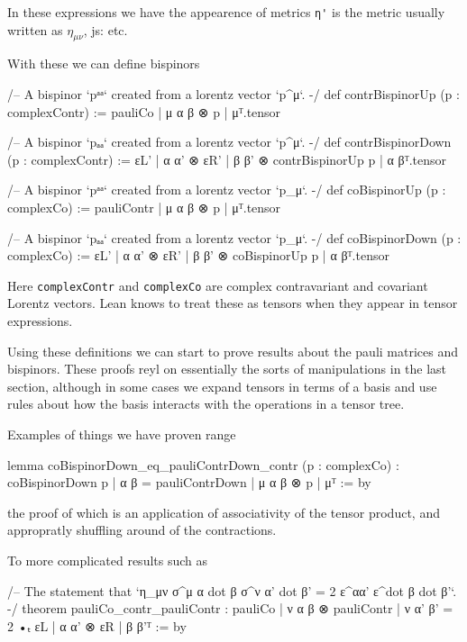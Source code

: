 \documentclass[a4paper, 11pt]{article}
\newcommand{\js}[1]{ {\color{magenta} js:  #1}}
\begin{document}
In these expressions we have the appearence of metrics \lstinline|η'| is the metric usually written as 
$\eta_{\mu \nu}$, \js{etc.}

With these we can define bispinors 
\begin{code}
/-- A bispinor `pᵃᵃ` created from a lorentz vector `p^μ`. -/
def contrBispinorUp (p : complexContr) :=
  {pauliCo | μ α β ⊗ p | μ}ᵀ.tensor

/-- A bispinor `pₐₐ` created from a lorentz vector `p^μ`. -/
def contrBispinorDown (p : complexContr) :=
  {εL' | α α' ⊗ εR' | β β' ⊗ contrBispinorUp p | α β}ᵀ.tensor

/-- A bispinor `pᵃᵃ` created from a lorentz vector `p_μ`. -/
def coBispinorUp (p : complexCo) := {pauliContr | μ α β ⊗ p | μ}ᵀ.tensor

/-- A bispinor `pₐₐ` created from a lorentz vector `p_μ`. -/
def coBispinorDown (p : complexCo) :=
  {εL' | α α' ⊗ εR' | β β' ⊗ coBispinorUp p | α β}ᵀ.tensor
\end{code}
Here \lstinline|complexContr| and \lstinline|complexCo| are complex contravariant and covariant Lorentz vectors.
Lean knows to treat these as tensors when they appear in tensor expressions. 


Using these definitions we can start to prove results about the pauli matrices and bispinors. 
These proofs reyl on essentially the sorts of manipulations in the last section, although in some cases 
we expand tensors in terms of a basis and use rules about how the basis interacts with the operations in a tensor tree. 

Examples of things we have proven range  
\begin{code}
lemma coBispinorDown_eq_pauliContrDown_contr (p : complexCo) :
  {coBispinorDown p | α β = pauliContrDown | μ α β ⊗ p | μ}ᵀ := by
\end{code}
the proof of which is an application of associativity of the tensor product, and appropratly shuffling 
around of the contractions. 

To more complicated results such as
\begin{code}
/-- The statement that `η_{μν} σ^{μ α dot β} σ^{ν α' dot β'} = 2 ε^{αα'} ε^{dot β dot β'}`. -/
theorem pauliCo_contr_pauliContr :
    {pauliCo | ν α β ⊗ pauliContr | ν α' β' = 2 •ₜ εL | α α' ⊗ εR | β β'}ᵀ := by
\end{code}
\end{document}
